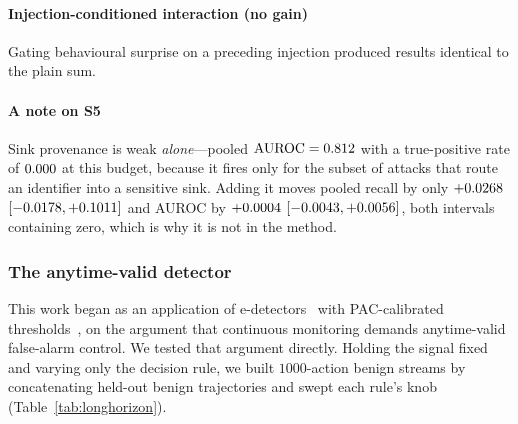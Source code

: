 \documentclass[pdflatex,sn-basic]{sn-jnl}%
\theoremstyle{thmstyleone}
\theoremstyle{thmstyletwo}
\theoremstyle{thmstylethree}
\begin{document}
\paragraph{Injection-conditioned interaction (no gain)} Gating behavioural
surprise on a preceding injection produced results identical to the plain sum.

\paragraph{A note on S5} Sink provenance is weak \emph{alone}---pooled
$\mathrm{AUROC} = 0.812$ with a true-positive rate of $0.000$ at
this budget,
because it fires only for the subset of attacks that route an identifier into a
sensitive sink. Adding it moves pooled recall by only $+0.0268$
$[-0.0178, +0.1011]$ and AUROC by $+0.0004$
$[-0.0043, +0.0056]$, both intervals containing zero, which is
why it is not in the method.

\subsubsection{The anytime-valid detector}
\label{sec:longhorizon}

This work began as an application of e-detectors~\citep{shin2023edetectors} with
PAC-calibrated thresholds~\citep{sadhuka2025evaluator}, on the argument that
continuous monitoring demands anytime-valid false-alarm control. We tested that
argument directly. Holding the signal fixed and varying only the decision rule, we
built $1000$-action benign streams by concatenating held-out benign trajectories
and swept each rule's knob (Table~\ref{tab:longhorizon}).
\end{document}
